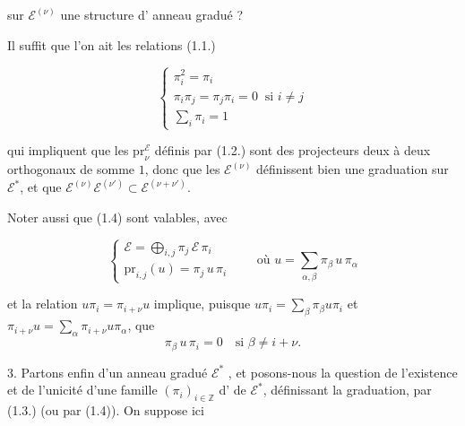 
sur $\mathcal{E}^{(\nu)}$ une structure d' anneau gradué ?

Il suffit que l'on ait les relations (1.1.)

\[ \begin{cases} \pi_{i}^{2} = \pi_{i} \\ \pi_{i} \pi_{j} = \pi_{j} \pi_{i} = 0 \ \text{ si } i \neq j \\ \sum_{i} \pi_{i} = 1 \end{cases} \]

qui impliquent que les $\mathrm{pr}_{\nu}^{\mathcal{E}}$ définis par (1.2.) sont
des projecteurs deux à deux orthogonaux de somme $1$, donc que les
$\mathcal{E}^{(\nu)}$ définissent bien une graduation  sur
$\mathcal{E}^{*}$,  et que
$\mathcal{E}^{(\nu)} \mathcal{E}^{(\nu')} \subset \mathcal{E}^{(\nu + \nu')}$.


Noter aussi que (1.4) sont valables,  avec \ill{}
 

\[ \begin{cases} \mathcal{E} = \bigoplus_{i,j} \pi_{j}\, \mathcal{E}\, \pi_{i} \\ \mathrm{pr}_{i,j}(u) = \pi_{j}\, u\, \pi_{i} \end{cases} \qquad \text{où } u = \sum_{\alpha,\beta} \pi_{\beta}\, u\, \pi_{\alpha} \]

et la relation $u \pi_{i} = \pi_{i+\nu} u$ implique, puisque
$u \pi_{i} = \sum_{\beta} \pi_{\beta} u \pi_{i}$ et
$\pi_{i+\nu} u = \sum_{\alpha} \pi_{i+\nu} u \pi_{\alpha}$, que
\[ \pi_{\beta}\, u\, \pi_{i} = 0 \quad \text{si } \beta \neq i + \nu . \]


3.  Partons enfin d'un  anneau gradué
$\mathcal{E}^{*}$ , et posons-nous la question de l'existence et
de l'unicité d'une famille $(\pi_{i})_{i \in \mathbb{Z}}$  d'\ill{} de $\mathcal{E}^{*}$, définissant la graduation, par (1.3.)
(ou par (1.4)). On suppose ici

